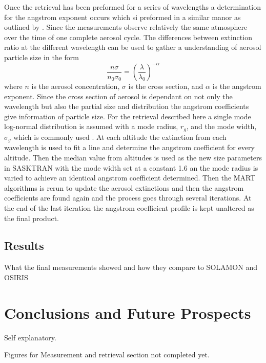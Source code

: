 \documentclass[12pt]{article}
\begin{document}
Once the retrieval has been preformed for a series of wavelengths a determination for the angstrom exponent occurs which si preformed in a similar manor as outlined by \cite{Rault2013}. Since the measurements observe relatively the same atmosphere over the time of one complete aerosol cycle. The differences between extinction ratio at the different wavelength can be used to gather a understanding of aerosol particle size in the form
\begin{equation}
    \frac{n\sigma}{n_{0}\sigma_{0}} = \left(\frac{\lambda}{\lambda_{0}}\right)^{-\alpha}
    \label{eqn:agstromCoefficient}
\end{equation}
where $n$ is the aerosol concentration, $\sigma$ is the cross section, and $\alpha$ is the angstrom exponent. Since the cross section of aerosol is dependant on not only the wavelength but also the partial size and distribution the angstrom coefficients give information of particle size. For the retrieval described here a single mode log-normal distribution is assumed with a mode radius, $r_{g}$, and the mode width, $\sigma_{g}$ which is commonly used \citep{Bingen2004}. At each altitude the extinction from each wavelength is used to fit a line and determine the angstrom coefficient for every altitude. Then the median value from altitudes is used as the new size parameters in SASKTRAN with the mode width set at a constant 1.6 an the mode radius is varied to achieve an identical angstrom coefficient determined. Then the MART algorithms is rerun to update the aerosol extinctions and then the angstrom coefficients are found again and the process goes through several iterations. At the end of the last iteration the angstrom coefficient profile is kept unaltered as the final product.

\subsection{Results}

What the final measurements showed and how they compare to SOLAMON and OSIRIS

\section{Conclusions and Future Prospects}

Self explanatory.

Figures for Measurement and retrieval section not completed yet.

\newpage


\end{document}
